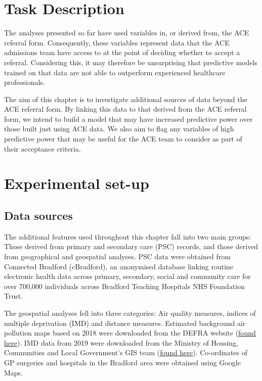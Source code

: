 \section{Task Description}

The analyses presented so far have used variables in, or derived from, the ACE referral form. Consequently, these variables represent data that the ACE admissions team have access to at the point of deciding whether to accept a referral. Considering this, it may therefore be unsurprising that predictive models trained on that data are not able to outperform experienced healthcare professionals.

The aim of this chapter is to investigate additional sources of data beyond the ACE referral form. By linking this data to that derived from the ACE referral form, we intend to build a model that may have increased predictive power over those built just using ACE data. We also aim to flag any variables of high predictive power that may be useful for the ACE team to consider as part of their acceptance criteria.

\section{Experimental set-up}

\subsection{Data sources}
\label{sec:additional-data-sources}

The additional features used throughout this chapter fall into two main groups: Those derived from primary and secondary care (PSC) records, and those derived from geographical and geospatial analyses. 
PSC data were obtained from Connected Bradford (cBradford), an anonymised database linking routine electronic health data across primary, secondary, social and community care for over 700,000 individuals across Bradford Teaching Hospitals NHS Foundation Trust.

The geospatial analyses fell into three categories: Air quality measures, indices of multiple deprivation (IMD) and distance measures. Estimated background air pollution maps based on 2018 were downloaded from the DEFRA website (\href{https://uk-air.defra.gov.uk/data/laqm-background-home}{found here}). IMD data from 2019 were downloaded from the Ministry of Housing, Communities and Local Government's GIS team (\href{https://data-communities.opendata.arcgis.com/datasets/5e1c399d787e48c0902e5fe4fc1ccfe3/about}{found here}). Co-ordinates of GP surgeries and hospitals in the Bradford area were obtained using Google Maps.

